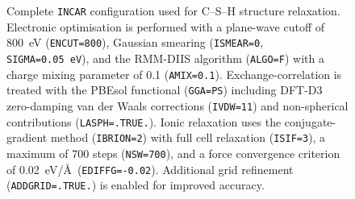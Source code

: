 \begin{figure}[H]  
	\centering  
	\begin{threeparttable}  
		\caption{Complete \texttt{INCAR} configuration used for C--S--H structure relaxation. Electronic optimisation is performed with a plane-wave cutoff of 800~eV (\texttt{ENCUT=800}), Gaussian smearing (\texttt{ISMEAR=0}, \texttt{SIGMA=0.05~eV}), and the RMM-DIIS algorithm (\texttt{ALGO=F}) with a charge mixing parameter of 0.1 (\texttt{AMIX=0.1}). Exchange-correlation is treated with the PBEsol functional (\texttt{GGA=PS}) including DFT-D3 zero-damping van der Waals corrections (\texttt{IVDW=11}) and non-spherical contributions (\texttt{LASPH=.TRUE.}). Ionic relaxation uses the conjugate-gradient method (\texttt{IBRION=2}) with full cell relaxation (\texttt{ISIF=3}), a maximum of 700 steps (\texttt{NSW=700}), and a force convergence criterion of 0.02~eV/\AA\ (\texttt{EDIFFG=-0.02}). Additional grid refinement (\texttt{ADDGRID=.TRUE.}) is enabled for improved accuracy.} 
		\label{fig:incar}  
\end{threeparttable}
\end{figure}

